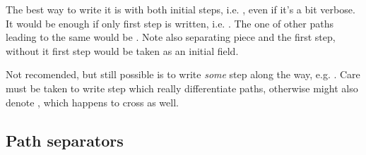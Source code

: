 The best way to write it is with both initial steps, i.e. , even if it's a bit verbose.
It would be enough if only first step is written, i.e. . The one of other paths leading
to the same  would be . Note also  separating piece and the first
step, without it first step would be taken as an initial field.

Not recomended, but still possible is to write \emph{some} step along the way, e.g. .
Care must be taken to write step which really differentiate paths, otherwise  might also
denote , which happens to cross  as well.

\clearpage %

\subsection*{Path separators}
\label{sec:Appendix/Path separators}

